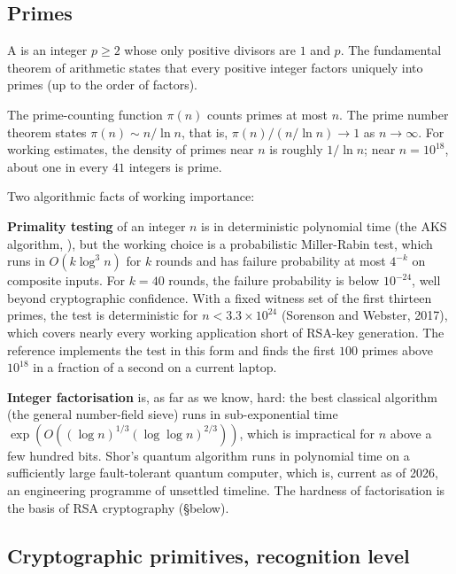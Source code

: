 

\subsection{Primes}

A  is an integer $p \geq 2$ whose only positive
divisors are $1$ and $p$. The fundamental theorem of arithmetic
states that every positive integer factors uniquely into primes (up
to the order of factors).

The prime-counting function $\pi(n)$ counts primes at most $n$.
The prime number theorem states $\pi(n) \sim n / \ln n$, that is,
$\pi(n) / (n / \ln n) \to 1$ as $n \to \infty$. For working
estimates, the density of primes near $n$ is roughly $1 / \ln n$;
near $n = 10^{18}$, about one in every $41$ integers is prime.

Two algorithmic facts of working importance:

\textbf{Primality testing} of an integer $n$ is in deterministic
polynomial time (the AKS algorithm,
\cite{paper:v2ch17-aks-2004}), but the working choice is a
probabilistic Miller-Rabin test, which runs in $O(k \log^{3} n)$
for $k$ rounds and has failure probability at most $4^{-k}$ on
composite inputs. For $k = 40$ rounds, the failure probability is
below $10^{-24}$, well beyond cryptographic confidence. With a
fixed witness set of the first thirteen primes, the test is
deterministic for $n < 3.3 \times 10^{24}$ (Sorenson and Webster,
2017), which covers nearly every working application short of
RSA-key generation. The reference
implements the test in this form and finds the first $100$ primes
above $10^{18}$ in a fraction of a second on a current laptop.

\textbf{Integer factorisation} is, as far as we know, hard: the
best classical algorithm (the general number-field sieve) runs in
sub-exponential time $\exp(O((\log n)^{1/3} (\log \log n)^{2/3}))$,
which is impractical for $n$ above a few hundred bits. Shor's
quantum algorithm runs in polynomial time on a sufficiently large
fault-tolerant quantum computer, which is, current as of 2026, an
engineering programme of unsettled timeline. The hardness of
factorisation is the basis of RSA cryptography (\S below).

\subsection{Cryptographic primitives, recognition level}

